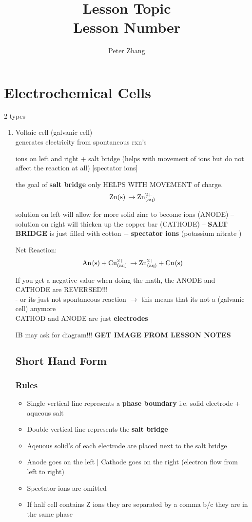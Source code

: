 \documentclass{article}
\title{Lesson Topic\\Lesson Number}
\author{Peter Zhang}
\begin{document}
\maketitle
\tableofcontents
\newpage

\section{Electrochemical Cells}
2 types
\begin{enumerate}
\item Voltaic cell (galvanic cell)\\generates electricity from spontaneous rxn's

ions on left and right + salt bridge (helps with movement of ions but do not affect the reaction at all) [spectator ions]

the goal of \textbf{salt bridge} only HELPS WITH MOVEMENT of charge.
$$\ce{Zn(s) \rightarrow Zn^{2+}_{(aq)}}$$

solution on left will allow for more solid zinc to become ions (ANODE) -- solution on right will thicken up the copper bar (CATHODE) -- \textbf{SALT BRIDGE} is just filled with cotton + \textbf{spectator ions} (potassium nitrate )

Net Reaction:
$$\ce{An(s) + Cu^{2+}_{(aq)} \rightarrow Zn^{2+}_{(aq)} + Cu(s)}$$

If you get a negative value when doing the math, the ANODE and CATHODE are REVERSED!!!\\
- or its just not spontaneous reaction $\rightarrow$ this means that its not a (galvanic cell) anymore\\
CATHOD and ANODE are just \textbf{electrodes}

IB may ask for diagram!!! \textbf{GET IMAGE FROM LESSON NOTES}

\subsection{Short Hand Form}
\subsubsection{Rules}
\begin{itemize}
\item Single vertical line represents a \textbf{phase boundary} i.e. solid electrode + aqueous salt
\item Double vertical line represents the \textbf{salt bridge} 
\item Aqeuous solid's of each electrode are placed next to the salt bridge
\item Anode goes on the left | Cathode goes on the right (electron flow from left to right)
\item Spectator ions are omitted
\item If half cell contains Z ions they are separated by a comma b/c they are in the same phase
\end{itemize}


\end{enumerate}
\end{document}
